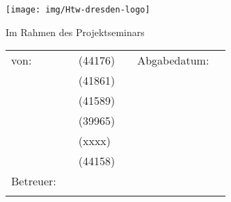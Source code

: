 \begin{titlepage}
    \thispagestyle{empty}
    \enlargethispage{35mm}
    \setlength{\headheight}{0mm}

    \sffamily



    \iftitlelogo{}
        \hspace{-1cm}\texttt{[image: img/Htw-dresden-logo]}
    \else
        {%
            \mdseries
            \Huge \MakeUppercase{\myDefUniversity}\\\vspace{0.5em}
        }
    \fi

    \vfill
    \vspace{10mm}
    \begin{center}
        \begin{huge}
            \myDefTitle{}
            \vfill
        \end{huge}
        \begin{Large}
            Im Rahmen des Projektseminars \\ 
            \myDefSeminar{}
            \vfill
        \end{Large}

    \end{center}

    \vfill
    \iftitlefinal{}
        \begin{small}
            \begin{tabularx}{\textwidth}{lllXll}
            	von: & \myDefAuthorA{} & (44176) & & Abgabedatum:  & \myDefDateHandIn{}\\
            	& \myDefAuthorB{} & (41861) \\
            	& \myDefAuthorC{} & (41589) \\
            	& \myDefAuthorD{} & (39965) \\
            	& \myDefAuthorE{} & (xxxx) \\
            	& \myDefAuthorF{} & (44158) \\
                Betreuer:    & \multicolumn{2}{l}{\myDefSupervisor{}} \\
                &  \multicolumn{2}{l}{\myDefChair{}} \\
            \end{tabularx}
        \end{small}
        \vspace{2em}
    \fi
    \vspace{3em}

    \normalsize

\end{titlepage}

